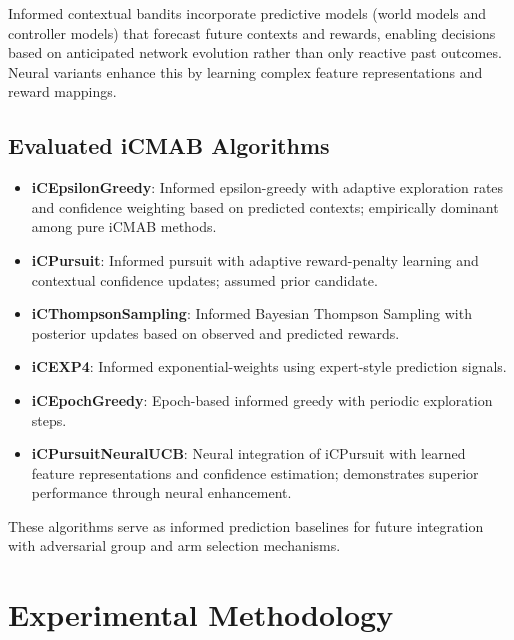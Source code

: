 \documentclass[12pt,a4paper]{article}
\begin{document}
Informed contextual bandits incorporate predictive models (world models and controller models) that forecast future contexts and rewards, enabling decisions based on anticipated network evolution rather than only reactive past outcomes. Neural variants enhance this by learning complex feature representations and reward mappings.

\subsection{Evaluated iCMAB Algorithms}
\begin{itemize}
\item \textbf{iCEpsilonGreedy}: Informed epsilon-greedy with adaptive exploration rates and confidence weighting based on predicted contexts; empirically dominant among pure iCMAB methods.
\item \textbf{iCPursuit}: Informed pursuit with adaptive reward-penalty learning and contextual confidence updates; assumed prior candidate.
\item \textbf{iCThompsonSampling}: Informed Bayesian Thompson Sampling with posterior updates based on observed and predicted rewards.
\item \textbf{iCEXP4}: Informed exponential-weights using expert-style prediction signals.
\item \textbf{iCEpochGreedy}: Epoch-based informed greedy with periodic exploration steps.
\item \textbf{iCPursuitNeuralUCB}: Neural integration of iCPursuit with learned feature representations and confidence estimation; demonstrates superior performance through neural enhancement.
\end{itemize}

These algorithms serve as informed prediction baselines for future integration with adversarial group and arm selection mechanisms.

\section{Experimental Methodology}
\end{document}
